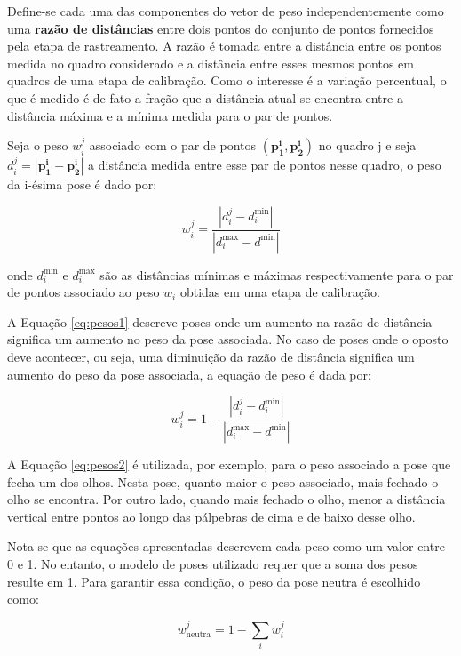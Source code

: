 Define-se cada uma das componentes do vetor de peso independentemente como uma \textbf{razão de distâncias} entre dois pontos do conjunto de pontos fornecidos pela etapa de rastreamento. A razão é tomada entre a distância entre os pontos medida no quadro considerado e a distância entre esses mesmos pontos em quadros de uma etapa de calibração. Como o interesse é a variação percentual, o que é medido é de fato a fração que a distância atual se encontra entre a distância máxima e a mínima medida para o par de pontos.

Seja o peso $w_i^j$ associado com o par de pontos $(\bm{p_1^i}, \bm{p_2^i})$ no quadro j e seja $d_i^j = |\bm{p_1^i} - \bm{p_2^i}|$ a distância medida entre esse par de pontos nesse quadro, o peso da i-ésima pose é dado por:

\begin{equation}
	w_i^j = \frac{|d_i^j - d_i^{\text{min}}|}{|d_i^{\text{max}} - d^{\text{min}}|}
   \label{eq:pesos1}
\end{equation}

onde $d_i^{\text{min}}$ e $d_i^{\text{max}}$ são as distâncias mínimas e máximas respectivamente para o par de pontos associado ao peso $w_i$ obtidas em uma etapa de calibração. 

A Equação \ref{eq:pesos1} descreve poses onde um aumento na razão de distância significa um aumento no peso da pose associada. No caso de poses onde o oposto deve acontecer, ou seja, uma diminuição da razão de distância significa um aumento do peso da pose associada, a equação de peso é dada por: 

\begin{equation}
	w_i^j = 1 - \frac{|d_i^j - d_i^{\text{min}}|}{|d_i^{\text{max}} - d^{\text{min}}|}
    \label{eq:pesos2}
\end{equation}

A Equação \ref{eq:pesos2} é utilizada, por exemplo, para o peso associado a pose que fecha um dos olhos. Nesta pose, quanto maior o peso associado, mais fechado o olho se encontra. Por outro lado, quando mais fechado o olho, menor a distância vertical entre pontos ao longo das pálpebras de cima e de baixo desse olho.

Nota-se que as equações apresentadas descrevem cada peso como um valor entre 0 e 1. No entanto, o modelo de poses utilizado requer que a soma dos pesos resulte em 1. Para garantir essa condição, o peso da pose neutra é escolhido como:

\begin{equation}
	w_{\text{neutra}}^j = 1 - \sum_{i} w_i^j
    \label{eq:pesos3}
\end{equation}

